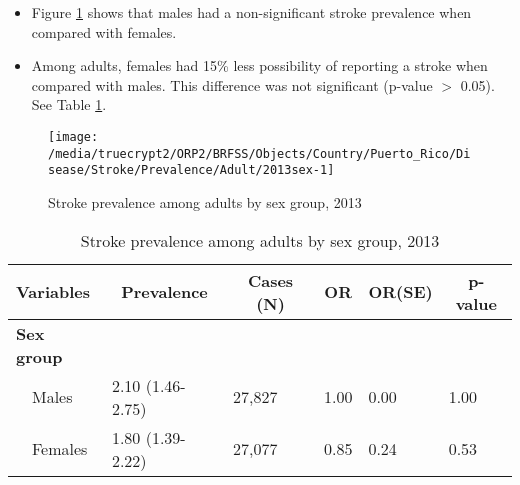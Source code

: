 \newpage
\begin{itemize}

\item Figure \ref{fig:sex.Stroke.2013} shows that males had a non-significant 
stroke prevalence when compared with females.


\item Among adults, females had 15\% less possibility of reporting a stroke when compared with males. This difference was not significant (p-value $>$ 0.05). See Table \ref{tab:sex.Stroke.2013}.

\end{itemize}

\begin{figure}[H]
\caption{Stroke prevalence among adults by sex group, 
2013}
\begin{knitrout}
\color{fgcolor}

{\centering \texttt{[image: /media/truecrypt2/ORP2/BRFSS/Objects/Country/Puerto\_Rico/Disease/Stroke/Prevalence/Adult/2013sex-1]} 

}



\end{knitrout}
\label{fig:sex.Stroke.2013}
\end{figure}

\begin{table}[H]
\caption{Stroke prevalence  among adults by sex group, 2013\label{tab:sex.Stroke.2013}} 
\begin{center}
\begin{tabular}{llllll}
\hline\hline
\multicolumn{1}{l}{Variables}&\multicolumn{1}{c}{Prevalence}&\multicolumn{1}{c}{Cases (N)}&\multicolumn{1}{c}{OR}&\multicolumn{1}{c}{OR(SE)}&\multicolumn{1}{c}{p-value}\tabularnewline
\hline
{\bfseries Sex group}&&&&&\tabularnewline
~~Males&2.10 (1.46-2.75)&27,827&1.00&0.00&1.00\tabularnewline
~~Females&1.80 (1.39-2.22)&27,077&0.85&0.24&0.53\tabularnewline
\hline
\end{tabular}\end{center}

\end{table}


